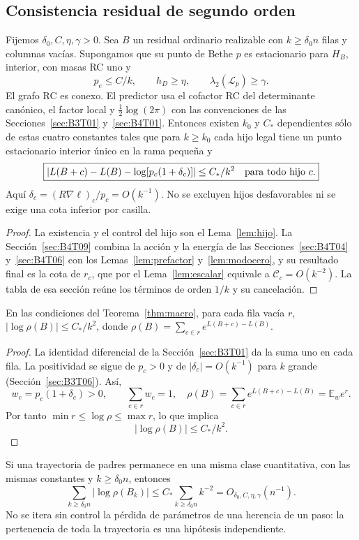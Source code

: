 \subsection{Consistencia residual de segundo orden}\label{sec:B4T05}
\begin{teorema}\label{thm:macro}
Fijemos $\delta_0,C,\eta,\gamma>0$. Sea $B$ un residual ordinario realizable
con $k\ge\delta_0n$ filas y columnas vacías. Supongamos que su punto de Bethe
$p$ es estacionario para $H_B$, interior, con masas RC uno y
\[
 p_e\le C/k,\qquad h_D\ge\eta,\qquad
 \lambda_2(\mathscr L_p)\ge\gamma.
\]
El grafo RC es conexo. El predictor usa el cofactor RC del determinante
canónico, el factor local y $\tfrac12\log(2\pi)$ con las convenciones de las Secciones~\ref{sec:B3T01}
y~\ref{sec:B4T01}.
Entonces existen $k_0$ y $C_*$ dependientes sólo de estas cuatro constantes
tales que para $k\ge k_0$ cada hijo legal tiene un punto estacionario
interior único en la rama pequeña y
\[
 \boxed{\left|L(B+c)-L(B)-\log[p_c(1+\delta_c)]\right|
 \le C_*/k^2\quad\hbox{para todo hijo }c.}
\]
Aquí $\delta_c=(R\nabla\ell)_c/p_c=O(k^{-1})$.
No se excluyen hijos desfavorables ni se exige una cota inferior por casilla.
\end{teorema}
\begin{proof}
La existencia y el control del hijo son el Lema~\ref{lem:hijo}. La Sección~\ref{sec:B4T09} combina
la acción y la energía de las Secciones~\ref{sec:B4T04} y~\ref{sec:B4T06} con los
Lemas~\ref{lem:prefactor} y~\ref{lem:modocero}, y su resultado final es la cota de $r_c$, que por el
Lema~\ref{lem:escalar} equivale a $\mathcal C_c=O(k^{-2})$. La tabla de esa sección reúne los términos
de orden $1/k$ y su cancelación.
\end{proof}

\begin{corolario}\label{cor:rho}
En las condiciones del Teorema~\ref{thm:macro}, para cada fila vacía $r$,
$|\log\rho(B)|\le C_*/k^2$, donde $\rho(B)=\sum_{c\in r}e^{L(B+c)-L(B)}$.
\end{corolario}
\begin{proof}
La identidad diferencial de la Sección~\ref{sec:B3T01} da la suma uno en cada fila.
La positividad se sigue de $p_c>0$ y de $|\delta_c|=O(k^{-1})$ para $k$ grande (Sección~\ref{sec:B3T06}).
Así,
\[
 w_c=p_c(1+\delta_c)>0,\qquad\sum_{c\in r}w_c=1,
 \quad \rho(B)=\sum_{c\in r}e^{L(B+c)-L(B)}=\mathbb E_w e^r.
\]
Por tanto $\min r\le\log\rho\le\max r$, lo que implica
\[
 \boxed{|\log\rho(B)|\le C_*/k^2.}
\]
\end{proof}
Si una trayectoria de padres permanece en una misma clase cuantitativa,
con las mismas constantes y $k\ge\delta_0n$, entonces
\[
 \sum_{k\ge\delta_0n}|\log\rho(B_k)|\le C_*\sum_{k\ge\delta_0n}k^{-2}
 =O_{\delta_0,C,\eta,\gamma}(n^{-1}).
\]
No se itera sin control la pérdida de parámetros de una herencia de un paso:
la pertenencia de toda la trayectoria es una hipótesis independiente.

